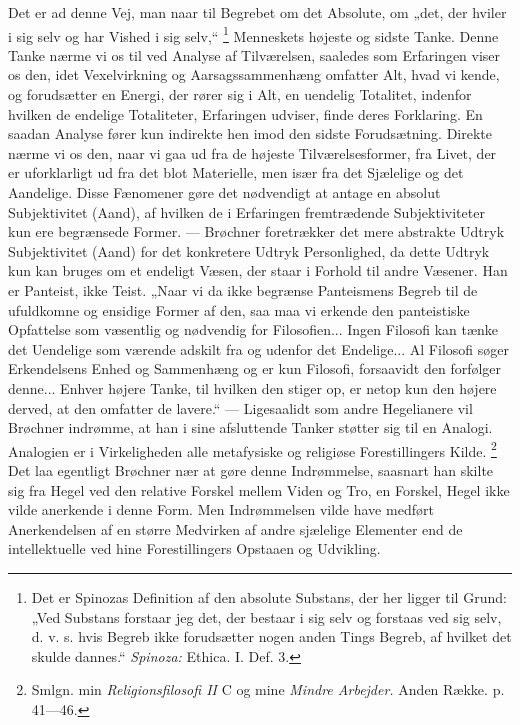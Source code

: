 \documentclass[12pt,a4paper,openany]{book}
\newcommand{\opage}[1]{\marginnote{\footnotesize\textit{[#1]}}}
\begin{document}
Det er ad denne Vej, man naar til Begrebet om det Absolute, om „det, der hviler
i sig selv og har Vished i sig selv,“%
\footnote[1]{Det er Spinozas Definition af den absolute Substans, der her
ligger til Grund: „Ved Substans forstaar jeg det, der bestaar i sig selv og
forstaas ved sig selv, d. v. s. hvis Begreb ikke forudsætter nogen anden Tings
Begreb, af hvilket det skulde dannes.“ \textit{Spinoza:} Ethica. I. Def. 3.}
Menneskets højeste og sidste Tanke. Denne Tanke nærme vi os til ved Analyse af
Tilværelsen, saaledes som Erfaringen viser os den, idet Vexelvirkning og
Aarsagssammenhæng omfatter Alt, hvad vi kende, og forudsætter en Energi, der
rører sig i Alt, en uendelig Totalitet, indenfor hvilken de endelige
Totaliteter, Erfaringen udviser, finde deres Forklaring. En saadan Analyse
fører kun indirekte hen imod den sidste Forudsætning. Direkte nærme vi os den,
naar vi gaa ud fra de højeste Tilværelsesformer, fra Livet, der er uforklarligt
ud fra det blot Materielle, men især fra det Sjælelige
\setcounter{footnote}{0}%
\opage{204}og det Aandelige. Disse Fænomener gøre det nødvendigt at antage en
absolut Subjektivitet (Aand), af hvilken de i Erfaringen fremtrædende
Subjektiviteter kun ere begrænsede Former. --- Brøchner foretrækker det mere
abstrakte Udtryk Subjektivitet (Aand) for det konkretere Udtryk Personlighed,
da dette Udtryk kun kan bruges om et endeligt Væsen, der staar i Forhold til
andre Væsener. Han er Panteist, ikke Teist. „Naar vi da ikke begrænse
Panteismens Begreb til de ufuldkomne og ensidige Former af den, saa maa vi
erkende den panteistiske Opfattelse som væsentlig og nødvendig for
Filosofien... Ingen Filosofi kan tænke det Uendelige som værende adskilt fra og
udenfor det Endelige... Al Filosofi søger Erkendelsens Enhed og Sammenhæng og
er kun Filosofi, forsaavidt den forfølger denne... Enhver højere Tanke, til
hvilken den stiger op, er netop kun den højere derved, at den omfatter de
lavere.“ --- Ligesaalidt som andre Hegelianere vil Brøchner indrømme, at han i
sine afsluttende Tanker støtter sig til en Analogi. Analogien er i
Virkeligheden alle metafysiske og religiøse Forestillingers Kilde.%
\footnote[1]{Smlgn. min \textit{Religionsfilosofi II} C og mine \textit{Mindre
Arbejder.} Anden Række. p. 41---46.} Det laa egentligt Brøchner nær at gøre
denne Indrømmelse, saasnart han skilte sig fra Hegel ved den relative Forskel
mellem Viden og Tro, en Forskel, Hegel ikke vilde anerkende i denne Form. Men
Indrømmelsen vilde have medført Anerkendelsen af en større Medvirken af andre
sjælelige Elementer end de intellektuelle ved hine Forestillingers Opstaaen og
Udvikling.
\end{document}
